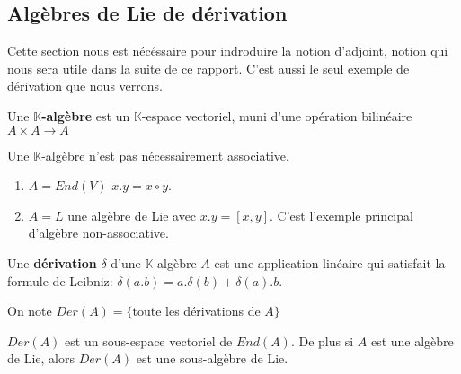 \documentclass[a4paper,openany,12pt]{report}
\newcommand{\KK}{\mathbb{K}}
\theoremstyle{break}
{\theorembodyfont{\upshape}
\newtheorem*{rmq}{Remarque :}
\newtheorem*{prv}{Preuve :}
\newtheorem*{ex}{Exemples :}
\newtheorem*{exe}{Exemple : }
\newtheorem*{nota}{Notation :}
\newtheorem*{dem}{D\'emonstration :}}
\begin{document}
\subsection{Algèbres de Lie de  dérivation}

\quad Cette section nous est nécéssaire pour indroduire la notion d'adjoint, notion qui nous sera utile dans la suite de ce rapport. C'est aussi le seul exemple de dérivation que nous verrons.

\begin{df}
\quad Une \textbf{$\KK$-algèbre} est un $\KK$-espace vectoriel, muni d'une opération bilinéaire $A \times A \to  A$
\end{df}

\begin{rmq}
Une $\KK$-algèbre n'est pas nécessairement associative.
\end{rmq}

\begin{ex}
\begin{enumerate}
\item $A=End(V)$ \quad $x.y=x\circ y$.

\item $A=L$ une algèbre de Lie avec $x. y= [x,y]$. C'est l'exemple principal d'algèbre non-associative.
\end{enumerate}
\end{ex}

\begin{df}
\quad Une \textbf{dérivation} $\delta$ d'une $\KK$-algèbre $A$ est une application linéaire qui satisfait la formule de Leibniz:
\center $\delta(a.b)=a.\delta(b)+\delta(a).b$.
\end{df}

\begin{nota}
\quad On note $Der(A)=\{ $toute les dérivations de $A \}$
\end{nota}

\begin{prop}
\quad $Der(A)$ est un sous-espace vectoriel de $End(A)$.
De plus si $A$ est une algèbre de Lie, alors $Der(A)$ est une sous-algèbre de Lie. 
\end{prop}
\end{document}
